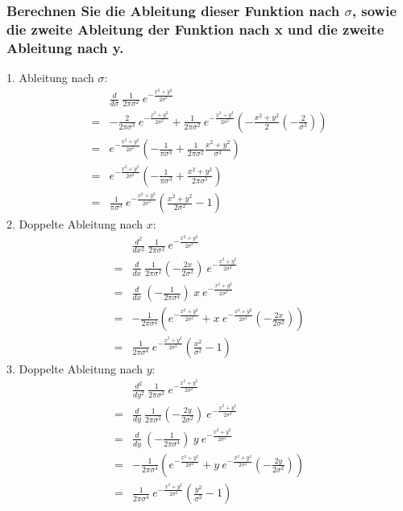 \subsubsection*{Berechnen Sie die Ableitung dieser Funktion nach $\sigma$, sowie die zweite Ableitung der Funktion nach x und die zweite Ableitung nach y.}
1. Ableitung nach $\sigma$:
\begin{align*}
& \frac{d}{d \sigma}~\frac{1}{2 \pi \sigma^2}~e^{-\frac{x^2 + y^2}{2 \sigma^2}}\\
=& -\frac{2}{2 \pi \sigma^3}~e^{-\frac{x^2 + y^2}{2 \sigma^2}} + \frac{1}{2 \pi \sigma^2}~e^{-\frac{x^2 + y^2}{2 \sigma^2}}(-\frac{x^2 + y^2}{2}(-\frac{2}{\sigma^3}))\\
=& e^{-\frac{x^2 + y^2}{2 \sigma^2}}(-\frac{1}{\pi \sigma^3} + \frac{1}{2 \pi \sigma^2} \frac{x^2 + y^2}{\sigma^3})\\
=& e^{-\frac{x^2 + y^2}{2 \sigma^2}} (-\frac{1}{\pi \sigma^3} + \frac{x^2 + y^2}{2 \pi \sigma^5})\\
=& \frac{1}{\pi \sigma^3}~e^{-\frac{x^2 + y^2}{2 \sigma^2}} (\frac{x^2 + y^2}{2 \sigma^2} - 1)
\end{align*}
2. Doppelte Ableitung nach $x$:
\begin{align*}
& \frac{d^2}{d x^2}~\frac{1}{2 \pi \sigma^2}~e^{-\frac{x^2 + y^2}{2 \sigma^2}}\\
=& \frac{d}{d x}~\frac{1}{2 \pi \sigma^2} (-\frac{2x}{2 \sigma^2})~e^{-\frac{x^2 + y^2}{2 \sigma^2}}\\
=& \frac{d}{d x}~(-\frac{1}{2 \pi \sigma^4})~x~e^{-\frac{x^2 + y^2}{2 \sigma^2}}\\
=& -\frac{1}{2 \pi \sigma^4}(e^{-\frac{x^2 + y^2}{2 \sigma^2}} + x~e^{-\frac{x^2 + y^2}{2 \sigma^2}} (-\frac{2x}{2 \sigma^2}))\\
=& \frac{1}{2 \pi \sigma^4}~e^{-\frac{x^2 + y^2}{2 \sigma^2}} (\frac{x^2}{\sigma^2} - 1)
\end{align*}
3. Doppelte Ableitung nach $y$:
\begin{align*}
& \frac{d^2}{d y^2}~\frac{1}{2 \pi \sigma^2}~e^{-\frac{x^2 + y^2}{2 \sigma^2}}\\
=& \frac{d}{d y}~\frac{1}{2 \pi \sigma^2} (-\frac{2y}{2 \sigma^2})~e^{-\frac{x^2 + y^2}{2 \sigma^2}}\\
=& \frac{d}{d y}~(-\frac{1}{2 \pi \sigma^4})~y~e^{-\frac{x^2 + y^2}{2 \sigma^2}}\\
=& -\frac{1}{2 \pi \sigma^4}(e^{-\frac{x^2 + y^2}{2 \sigma^2}} + y~e^{-\frac{x^2 + y^2}{2 \sigma^2}} (-\frac{2y}{2 \sigma^2}))\\
=& \frac{1}{2 \pi \sigma^4}~e^{-\frac{x^2 + y^2}{2 \sigma^2}} (\frac{y^2}{\sigma^2} - 1)
\end{align*}

